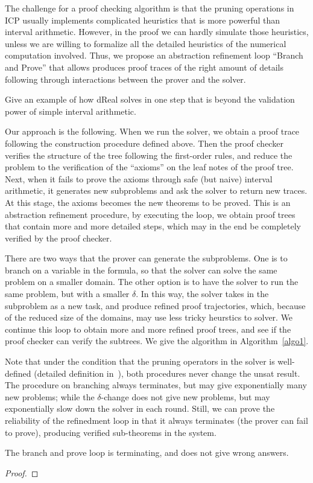 \documentclass[envcountsect]{llncs}
\begin{document}
The challenge for a proof checking algorithm is that the pruning operations in
ICP usually implements complicated heuristics that is more powerful than
interval arithmetic. However, in the proof we can hardly simulate those
heuristics, unless we are willing to formalize all the detailed heuristics of
the numerical computation involved. Thus, we propose an abstraction refinement
loop ``Branch and Prove'' that allows produces proof traces of the right amount
of details following through interactions between the prover and the solver. 

\begin{example}
Give an example of how dReal solves in one step that is beyond the validation
power of simple interval arithmetic.
\end{example}

Our approach is the following. When we run the solver, we obtain a proof trace
following the construction procedure defined above. Then the proof checker
verifies the structure of the tree following the first-order rules, and reduce
the problem to the verification of the ``axioms'' on the leaf notes of the
proof tree. Next, when it fails to prove the axioms through safe (but naive)
interval arithmetic, it generates new subproblems and ask the solver to return
new traces. At this stage, the axioms becomes the new theorems to be proved.
This is an abstraction refinement procedure, by executing the loop, we obtain
proof trees that contain more and more detailed steps, which may in the end be
completely verified by the proof checker. 

There are two ways that the prover can generate the subproblems. One is to
branch on a variable in the formula, so that the solver can solve the same
problem on a smaller domain. The other option is to have the solver to run the
same problem, but with a smaller $\delta$. In this way, the solver takes in the
subproblem as a new task, and produce refined proof trajectories, which,
because of the reduced size of the domains, may use less tricky heurstics to
solver. We continue this loop to obtain more and more refined proof trees, and
see if the proof checker can verify the subtrees. We give the algorithm in
Algorithm~\ref{algo1}. 

\begin{example}
 
\end{example}

Note that under the condition that the pruning operators in the solver is
well-defined (detailed definition in~\cite{}), both procedures never change the
unsat result. The procedure on branching always terminates, but may give
exponentially many new problems; while the $\delta$-change does not give new
problems, but may exponentially slow down the solver in each round. Still, we
can prove the reliability of the refinedment loop in that it always terminates
(the prover can fail to prove), producing verified sub-theorems in the system. 
\begin{proposition}
The branch and prove loop is terminating, and does not give wrong answers. 
\end{proposition}
\begin{proof}
\end{proof}
\end{document}
